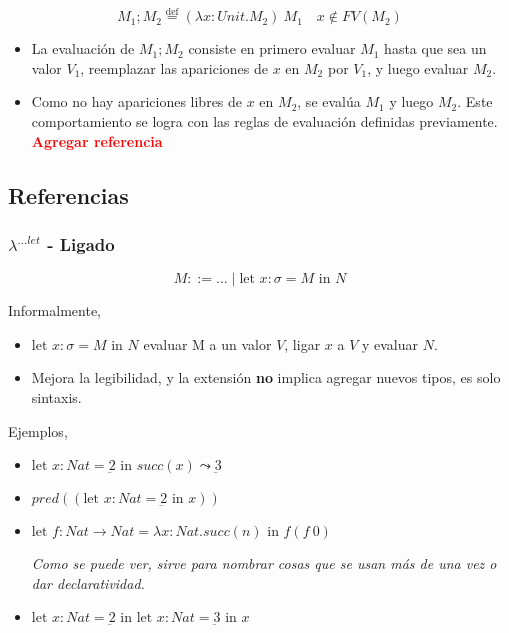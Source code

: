 \documentclass{report}
\theoremstyle{definition} %
\newcommand{\todo}[1]{{\textcolor{red}{\textbf{#1}}}}
\newcommand{\eqdef}{\overset{\text{def}}{=}}
\newcommand{\tfunc}[2]{#1 \to #2}
\newcommand{\abs}[3]{\lambda #1 : #2 . #3}
\newcommand{\app}[2]{#1 \ #2} %
\newcommand{\fv}[1]{FV(#1)}
\newcommand{\suc}[1]{succ(#1)}
\newcommand{\pred}[1]{pred(#1)}
\newcommand{\num}[1]{\underbar{#1}} %
\newcommand{\seq}[2]{#1;#2}
\newcommand{\lambdalet}{\lambda^{\dots let}}
\newcommand{\letin}[4]{\text{let } #1 : #2 = #3 \text{ in } #4}
\newcommand{\evalsto}{\leadsto}
\begin{document}
\[
    \seq{M_1}{M_2} \eqdef \app{(\abs{x}{Unit}{M_2})}{M_1} \quad x\notin \fv{M_2}
\]

\begin{itemize}
    \item La evaluación de $M_1; M_2$ consiste en primero evaluar $M_1$ hasta
    que sea un valor $V_1$, reemplazar las apariciones de $x$ en $M_2$ por
    $V_1$, y luego evaluar $M_2$.
    \item Como no hay apariciones libres de $x$ en $M_2$, se evalúa $M_1$ y
    luego $M_2$. Este comportamiento se logra con las reglas de evaluación
    definidas previamente. \todo{Agregar referencia}
\end{itemize}

\subsection{Referencias}

\subsubsection{$\lambdalet$ - Ligado}

\[
    M ::= \dots \mid \letin{x}{\sigma}{M}{N}
\]

Informalmente,

\begin{itemize}
    \item $\letin{x}{\sigma}{M}{N}$ evaluar M a un valor $V$, ligar $x$ a $V$ y
    evaluar $N$.
    \item Mejora la legibilidad, y la extensión \textbf{no} implica agregar
    nuevos tipos, es solo sintaxis.
\end{itemize}

Ejemplos,

\begin{itemize}
    \item $\letin{x}{Nat}{\num{2}}{\suc{x}} \evalsto \num{3}$
    \item $\pred{(\letin{x}{Nat}{\num{2}}{x})}$
    \item \(
        \letin
            {f}
            {\tfunc{Nat}{Nat}}
            {\abs{x}{Nat}{\suc{n}}}
            {f(\app{f}{0})}
    \)

    \textit{Como se puede ver, sirve para nombrar cosas que se usan más de una vez o dar declaratividad.}
    \item \(
        \letin
            {x}
            {Nat}
            {\num{2}}
            {\letin{x}{Nat}{\num{3}}{x}}
    \)
\end{itemize}
\end{document}

